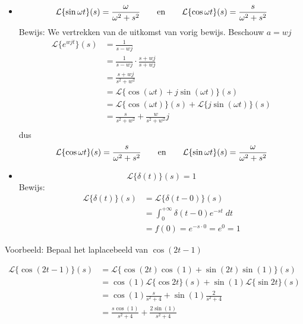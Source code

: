 \documentclass[12pt]{report}
\newcommand{\example}[2]{
    \hrulefill
    
    Voorbeeld: #1
    
    #2
    
    \hrulefill
}
\begin{document}
\begin{itemize}
\item $$\mathcal{L}\{\sin \omega t\}(s) = \frac{\omega}{\omega^2 + s^2} \qquad  \hbox{en} \qquad  \mathcal{L}\{\cos \omega t\}(s) = \frac{s}{\omega^2 + s^2}$$
Bewijs: We vertrekken van de uitkomst van vorig bewijs. Beschouw $a = wj$
\begin{equation*}
\begin{split}
\mathcal{L}\{e^{wjt}\}(s) & = \frac{1}{s - wj} \\
                            & = \frac{1}{s - wj} \cdot \frac{s + wj}{s + wj} \\
                & = \frac{s + wj}{s^2 + w^2}\\
                & = \mathcal{L}\{\cos (\omega t) + j\sin(\omega t)\}(s) \\
                & = \mathcal{L}\{\cos (\omega t)\}(s) + \mathcal{L}\{j\sin(\omega t) \}(s) \\
                & = \frac{s}{s^2 + w^2} + \frac{w}{s^2 + w^2}j \\ 
\end{split}
\end{equation*}
dus $$\mathcal{L}\{\cos \omega t\}(s) = \frac{s}{\omega^2 + s^2} \qquad  \hbox{en} \qquad  \mathcal{L}\{\sin \omega t\}(s) = \frac{\omega}{\omega^2 + s^2}$$

\item 
$$\mathcal{L}\{\delta(t)\}(s) = 1$$
Bewijs:
\begin{equation*}
\begin{split}
    \mathcal{L}\{\delta(t)\}(s) & = \mathcal{L}\{\delta(t - 0)\}(s) \\
                & = \int_{0}^{+\infty}\delta(t - 0)e^{-st}\;dt \\
                & = f(0) = e^{-s\cdot0} = e^{0} = 1
\end{split}
\end{equation*}
\end{itemize}
\example{Bepaal het laplacebeeld van $\cos{(2t - 1)}$}{
\begin{equation*}
\begin{split}
\mathcal{L}\{\cos(2t - 1)\}(s) & = \mathcal{L}\{\cos(2t)\cos( 1 )+ \sin(2t)\sin (1)\}(s) \\
                & = \cos (1) \mathcal{L}\{\cos 2t\}(s) + \sin (1 )\mathcal{L}\{\sin 2t\}(s)\\
                & = \cos (1) \frac{s}{s^2 + 4} + \sin (1) \frac{2}{s^2 + 4} \\
                & = \frac{s\cos(1)}{s^2 + 4} + \frac{2\sin(1)}{s^2 + 4}
\end{split}
\end{equation*}
}
\end{document}

